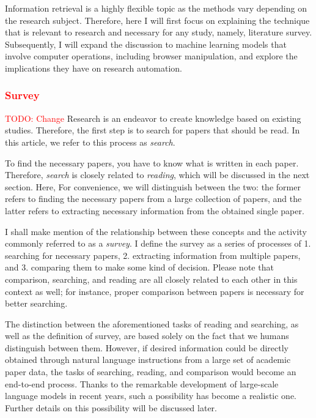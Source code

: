 \documentclass{book}
\begin{document}
Information retrieval is a highly flexible topic as the methods vary depending on the research subject. Therefore, here I will first focus on explaining the technique that is relevant to research and necessary for any study, namely, literature survey. Subsequently, I will expand the discussion to machine learning models that involve computer operations, including browser manipulation, and explore the implications they have on research automation.

\subsubsection{\textcolor{red}{Survey}}
\textcolor{red}{TODO: Change}
Research is an endeavor to create knowledge based on existing studies. Therefore, the first step is to search for papers that should be read. In this article, we refer to this process as \textit{search}.

To find the necessary papers, you have to know what is written in each paper. Therefore, \textit{search} is closely related to \textit{reading}, which will be discussed in the next section. Here, For convenience, we will distinguish between the two: the former refers to finding the necessary papers from a large collection of papers, and the latter refers to extracting necessary information from the obtained single paper.

I shall make mention of the relationship between these concepts and the activity commonly referred to as a \textit{survey}. I define the survey as a series of processes of 1. searching for necessary papers, 2. extracting information from multiple papers, and 3. comparing them to make some kind of decision. Please note that comparison, searching, and reading are all closely related to each other in this context as well; for instance, proper comparison between papers is necessary for better searching.

The distinction between the aforementioned tasks of reading and searching, as well as the definition of survey, are based solely on the fact that we humans distinguish between them. However, if desired information could be directly obtained through natural language instructions from a large set of academic paper data, the tasks of searching, reading, and comparison would become an end-to-end process. Thanks to the remarkable development of large-scale language models in recent years, such a possibility has become a realistic one. Further details on this possibility will be discussed later.
\end{document}
